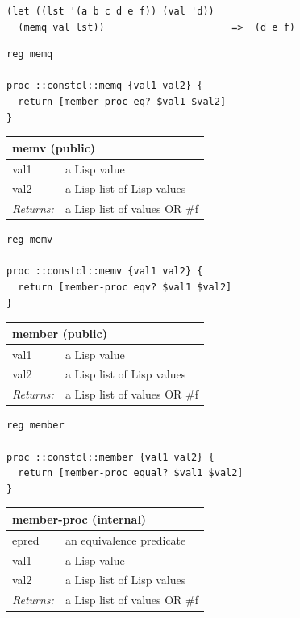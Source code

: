 \documentclass[twoside,9pt]{report}
\begin{document}
\noindent\makebox[\linewidth]{\rule{\linewidth}{0.4pt}}
\begin{lstlisting}
(let ((lst '(a b c d e f)) (val 'd))
  (memq val lst))                      =>  (d e f)
\end{lstlisting}
\noindent\makebox[\linewidth]{\rule{\linewidth}{0.4pt}}
\noindent\makebox[\linewidth]{\rule{\linewidth}{0.4pt}}
\begin{lstlisting}
reg memq
 
proc ::constcl::memq {val1 val2} {
  return [member-proc eq? $val1 $val2]
}
\end{lstlisting}
\noindent\makebox[\linewidth]{\rule{\linewidth}{0.4pt}}
\begin{tabular}{ |l l| }
\hline
\multicolumn{2}{|l|}{memv (public)} \\
\hline
val1 & a Lisp value \\
val2 & a Lisp list of Lisp values \\
\textit{Returns:} & a Lisp list of values OR \#f \\
\hline
\end{tabular}

\noindent\makebox[\linewidth]{\rule{\linewidth}{0.4pt}}
\begin{lstlisting}
reg memv
 
proc ::constcl::memv {val1 val2} {
  return [member-proc eqv? $val1 $val2]
}
\end{lstlisting}
\noindent\makebox[\linewidth]{\rule{\linewidth}{0.4pt}}
\begin{tabular}{ |l l| }
\hline
\multicolumn{2}{|l|}{member (public)} \\
\hline
val1 & a Lisp value \\
val2 & a Lisp list of Lisp values \\
\textit{Returns:} & a Lisp list of values OR \#f \\
\hline
\end{tabular}

\noindent\makebox[\linewidth]{\rule{\linewidth}{0.4pt}}
\begin{lstlisting}
reg member
 
proc ::constcl::member {val1 val2} {
  return [member-proc equal? $val1 $val2]
}
\end{lstlisting}
\noindent\makebox[\linewidth]{\rule{\linewidth}{0.4pt}}
\begin{tabular}{ |l l| }
\hline
\multicolumn{2}{|l|}{member-proc (internal)} \\
\hline
epred & an equivalence predicate \\
val1 & a Lisp value \\
val2 & a Lisp list of Lisp values \\
\textit{Returns:} & a Lisp list of values OR \#f \\
\hline
\end{tabular}
\end{document}
